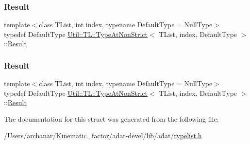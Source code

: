 \mbox{\label{structUtil_1_1TL_1_1TypeAtNonStrict_a39b06fe5e93590ee7a8870acb2017521}} 
\subsubsection{\texorpdfstring{Result}{Result}\hspace{0.1cm}{\footnotesize\ttfamily [2/3]}}
{\footnotesize\ttfamily template$<$class T\+List, int index, typename Default\+Type = Null\+Type$>$ \\
typedef Default\+Type \mbox{\hyperlink{structUtil_1_1TL_1_1TypeAtNonStrict}{Util\+::\+T\+L\+::\+Type\+At\+Non\+Strict}}$<$ T\+List, index, Default\+Type $>$\+::\mbox{\hyperlink{structUtil_1_1TL_1_1TypeAtNonStrict_a39b06fe5e93590ee7a8870acb2017521}{Result}}}

\mbox{\label{structUtil_1_1TL_1_1TypeAtNonStrict_a39b06fe5e93590ee7a8870acb2017521}} 
\subsubsection{\texorpdfstring{Result}{Result}\hspace{0.1cm}{\footnotesize\ttfamily [3/3]}}
{\footnotesize\ttfamily template$<$class T\+List, int index, typename Default\+Type = Null\+Type$>$ \\
typedef Default\+Type \mbox{\hyperlink{structUtil_1_1TL_1_1TypeAtNonStrict}{Util\+::\+T\+L\+::\+Type\+At\+Non\+Strict}}$<$ T\+List, index, Default\+Type $>$\+::\mbox{\hyperlink{structUtil_1_1TL_1_1TypeAtNonStrict_a39b06fe5e93590ee7a8870acb2017521}{Result}}}



The documentation for this struct was generated from the following file\+:\begin{DoxyCompactItemize}
\item 
/\+Users/archanar/\+Kinematic\+\_\+factor/adat-\/devel/lib/adat/\mbox{\hyperlink{adat-devel_2lib_2adat_2typelist_8h}{typelist.\+h}}\end{DoxyCompactItemize}
